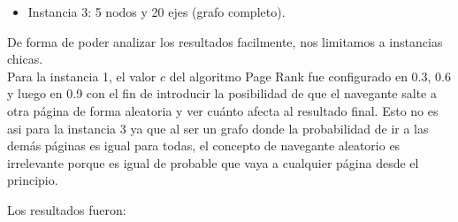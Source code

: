 \begin{itemize}
\begin{center}
        \end{center}
    \item Instancia 3: 5 nodos y 20 ejes (grafo completo).
        \begin{center}
        \end{center}
\end{itemize}
De forma de poder analizar los resultados facilmente, nos limitamos a instancias chicas.\\

Para la instancia 1, el valor $c$ del algoritmo Page Rank fue configurado en 0.3, 0.6 y luego en 0.9 con el fin de introducir la posibilidad de que el navegante salte a otra página de forma aleatoria y ver cuánto afecta al resultado final. Esto no es asi para la instancia 3 ya que al ser un grafo donde la probabilidad de ir a las demás páginas es igual para todas, el concepto de navegante aleatorio es irrelevante porque es igual de probable que vaya a cualquier página desde el principio.

Los resultados fueron:


